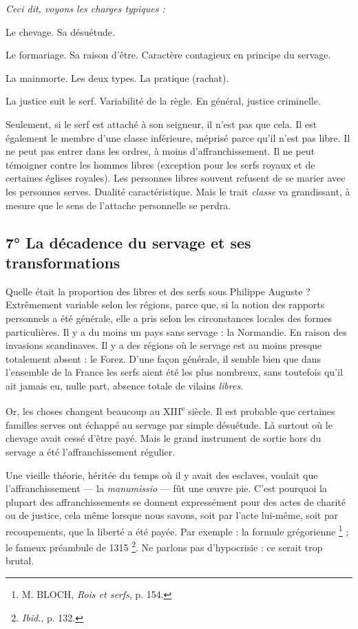 \documentclass[french,twoside]{book} %
\newlength{\listmod}
\newcommand{\listhead}[1]{\hspace{-1\listmod}\emph{#1}}
\begin{document}
\begin{listalpha}[itemsep=0pt,]
\item[]\listhead{Ceci dit, voyons les charges typiques :}
\item Le chevage. Sa désuétude.
\item Le formariage. Sa raison d’être. Caractère contagieux en principe du servage.
\item La mainmorte. Les deux types. La pratique (rachat).
\item La justice suit le serf. Variabilité de la règle. En général, justice criminelle.

\end{listalpha}\noindent Seulement, si le serf est attaché à son seigneur, il n’est pas que cela. Il est également le membre d’une classe inférieure, méprisé parce qu’il n’est pas libre. Il ne peut pas entrer dans les ordres, à moins d’affranchissement. Il ne peut témoigner contre les hommes libres (exception pour les serfs royaux et de certaines églises royales). Les personnes libres souvent refusent de se marier avec les personnes serves. Dualité caractéristique. Mais le trait \emph{classe} va grandissant, à mesure que le sens de l’attache personnelle se perdra.
\subsection[7° La décadence du servage et ses transformations]{7° La décadence du servage et ses transformations}
\noindent Quelle était la proportion des libres et des serfs sous Philippe Auguste ? Extrêmement variable selon les régions, parce que, si la notion des rapports personnels a été générale, elle a pris selon les circonstances locales des formes particulières. Il y a du moins un pays sans servage : la Normandie. En raison des invasions scandinaves. Il y a des régions où le servage est au moins presque totalement absent : le Forez. D’une façon générale, il semble bien que dans l’ensemble de la France les serfs aient été les plus nombreux, sans toutefois qu’il ait jamais eu, nulle part, absence totale de vilains \emph{libres}.\par
Or, les choses changent beaucoup au XIII\textsuperscript{e} siècle. Il est probable que certaines familles serves ont échappé au servage par simple désuétude. Là surtout où le chevage avait cessé d’être payé. Mais le grand instrument de sortie hors du servage a été l’affranchissement régulier.\par
Une vieille théorie, héritée du temps où il y avait des esclaves, voulait que l’affranchissement — la \emph{manumissio} — fût une œuvre pie. C’est pourquoi la plupart des affranchissements se donnent expressément pour des actes de charité ou de justice, cela même lorsque nous savons, soit par l’acte lui-même, soit par recoupements, que la liberté a été payée. Par exemple : la formule grégorienne \footnote{ M. BLOCH, {\itshape Rois et serfs}, p. 154. } ; le fameux préambule de 1315 \footnote{{\itshape Ibid.}, p. 132.}. Ne parlons pas d’hypocrisie : ce serait trop brutal.\par
\end{document}
